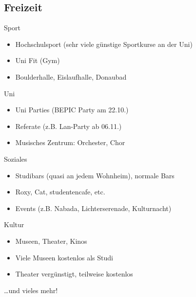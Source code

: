 \documentclass[
	aspectratio=169, 
	10pt 
]{beamer}
\begin{document}
\subsection{Freizeit}
\begin{frame}{\insertsubsection}
    \begin{fancycolumns}[T, columns=2]
        \begin{definition}{Sport}
            \begin{itemize}
                \item Hochschulsport (sehr viele günstige Sportkurse an der Uni)
                \item Uni Fit (Gym)
                \item Boulderhalle, Eislaufhalle, Donaubad
            \end{itemize}
        \end{definition}

        \begin{definition}{Uni}
            \begin{itemize}
                \item Uni Parties (BEPIC Party am 22.10.)
                \item Referate (z.B. Lan-Party ab 06.11.)
                \item Musisches Zentrum: Orchester, Chor
            \end{itemize}
        \end{definition}
        
        \nextcolumn
        \begin{definition}{Soziales}
            \begin{itemize}
                \item Studibars (quasi an jedem Wohnheim), normale Bars
                \item Roxy, Cat, studentencafe, etc.
                \item Events (z.B. Nabada, Lichterserenade, Kulturnacht) 
            \end{itemize}
        \end{definition}

        \begin{definition}{Kultur}
            \begin{itemize}
                \item Museen, Theater, Kinos
                \item Viele Museen kostenlos als Studi
                \item Theater vergünstigt, teilweise kostenlos
            \end{itemize}
        \end{definition}

    \end{fancycolumns}
    \dots und vieles mehr!
\end{frame}
\end{document}
